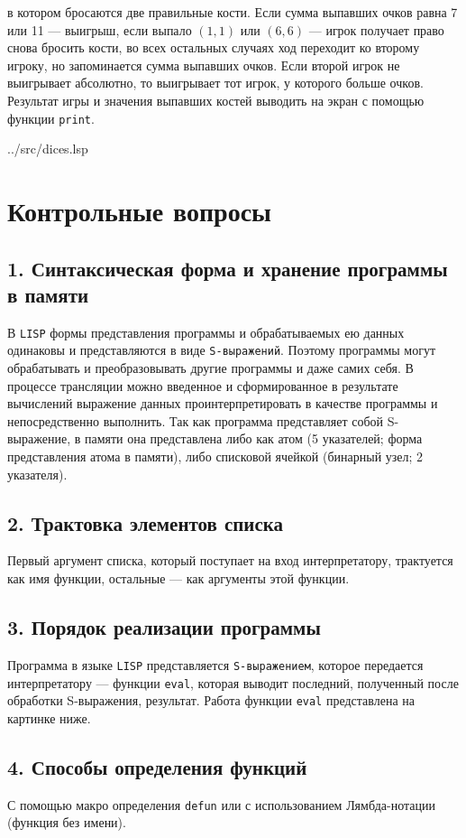в котором бросаются две правильные кости. Если сумма выпавших очков равна 7 или 11 --- выигрыш, если выпало $(1, 1)$ или $(6, 6)$ --- игрок получает право снова бросить кости, во всех остальных случаях ход переходит ко второму игроку, но запоминается сумма выпавших очков. Если второй игрок не выигрывает абсолютно, то выигрывает тот игрок, у которого больше очков. Результат игры и значения выпавших костей выводить на экран с помощью функции \texttt{print}.

\clearpage
\begin{lstinputlisting}[
	caption={Задание 5},
	label={lst:t5},
	style={lsp},
	linerange={1-44},
	]{../src/dices.lsp}
\end{lstinputlisting}

\section*{Контрольные вопросы}

\subsection*{1. Синтаксическая форма и хранение программы в памяти}

В \texttt{LISP} формы представления программы и обрабатываемых ею данных одинаковы и представляются в виде \texttt{S-выражений}. Поэтому программы могут обрабатывать и преобразовывать другие программы и даже самих себя. В процессе трансляции можно введенное и сформированное в результате вычислений выражение данных проинтерпретировать в качестве программы и непосредственно выполнить. Так как программа представляет собой S-выражение, в памяти она представлена либо как атом (5 указателей; форма представления атома в памяти), либо списковой ячейкой (бинарный узел; 2 указателя).

\subsection*{2. Трактовка элементов списка}

Первый аргумент списка, который поступает на вход интерпретатору, трактуется как имя функции, остальные --- как аргументы этой функции.

\subsection*{3. Порядок реализации программы}

Программа в языке \texttt{LISP} представляется \texttt{S-выражением}, которое передается интерпретатору --- функции \texttt{eval}, которая выводит последний, полученный после обработки S-выражения, результат.
Работа функции \texttt{eval} представлена на картинке ниже.

\subsection*{4. Способы определения функций}

С помощью макро определения \texttt{defun} или с использованием Лямбда-нотации (функция без имени).